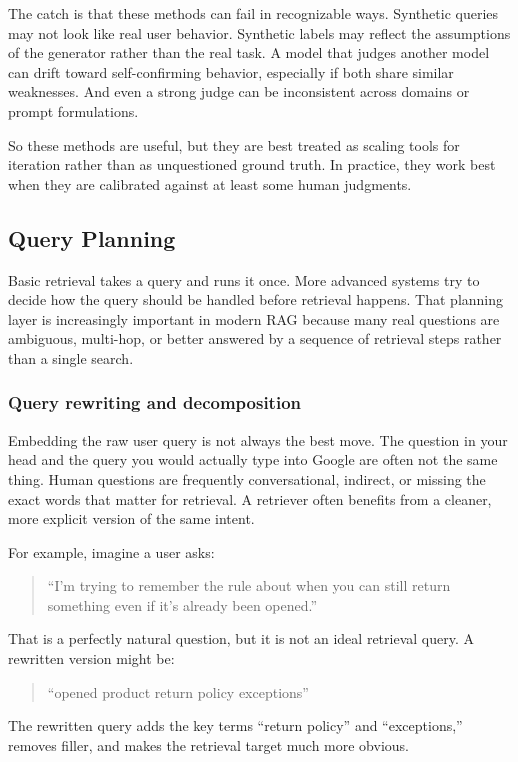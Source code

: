 \documentclass[12pt]{article}
\begin{document}
The catch is that these methods can fail in recognizable ways. Synthetic
queries may not look like real user behavior. Synthetic labels may reflect
the assumptions of the generator rather than the real task. A model that
judges another model can drift toward self-confirming behavior, especially
if both share similar weaknesses. And even a strong judge can be
inconsistent across domains or prompt formulations.

So these methods are useful, but they are best treated as scaling tools
for iteration rather than as unquestioned ground truth. In practice, they
work best when they are calibrated against at least some human judgments.

\subsection{Query Planning}

Basic retrieval takes a query and runs it once. More advanced systems try
to decide how the query should be handled before retrieval happens. That
planning layer is increasingly important in modern RAG because many real
questions are ambiguous, multi-hop, or better answered by a sequence of
retrieval steps rather than a single search.

\subsubsection{Query rewriting and decomposition}

Embedding the raw user query is not always the best move. The question in
your head and the query you would actually type into Google are often not
the same thing. Human questions are frequently conversational, indirect,
or missing the exact words that matter for retrieval. A retriever often
benefits from a cleaner, more explicit version of the same intent.

For example, imagine a user asks:
\begin{quote}
``I'm trying to remember the rule about when you can still return
something even if it's already been opened.''
\end{quote}
That is a perfectly natural question, but it is not an ideal retrieval
query. A rewritten version might be:
\begin{quote}
``opened product return policy exceptions''
\end{quote}
The rewritten query adds the key terms ``return policy'' and
``exceptions,'' removes filler, and makes the retrieval target much more
obvious.
\end{document}
